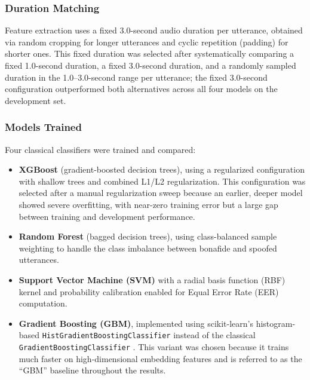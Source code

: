 \subsubsection{Duration Matching}

Feature extraction uses a fixed 3.0-second audio duration per utterance, obtained via random cropping for longer utterances and cyclic repetition (padding) for shorter ones. This fixed duration was selected after systematically comparing a fixed 1.0-second duration, a fixed 3.0-second duration, and a randomly sampled duration in the 1.0--3.0-second range per utterance; the fixed 3.0-second configuration outperformed both alternatives across all four models on the development set.

\subsubsection{Models Trained}

Four classical classifiers were trained and compared:
\begin{itemize}
    \item \textbf{XGBoost} \cite{Chen2016_xgboost} (gradient-boosted decision trees), using a regularized configuration with shallow trees and combined L1/L2 regularization. This configuration was selected after a manual regularization sweep because an earlier, deeper model showed severe overfitting, with near-zero training error but a large gap between training and development performance.
    
    \item \textbf{Random Forest} \cite{Breiman2001_rf} (bagged decision trees), using class-balanced sample weighting to handle the class imbalance between bonafide and spoofed utterances.
    
    \item \textbf{Support Vector Machine (SVM)} \cite{Cortes1995_svm} with a radial basis function (RBF) kernel and probability calibration enabled for Equal Error Rate (EER) computation.
    
    \item \textbf{Gradient Boosting (GBM)}, implemented using scikit-learn's histogram-based \texttt{HistGradientBoostingClassifier} \cite{Pedregosa2011_sklearn, Ke2017_lightgbm} instead of the classical \texttt{GradientBoostingClassifier} \cite{Friedman2001_gb}. This variant was chosen because it trains much faster on high-dimensional embedding features and is referred to as the ``GBM'' baseline throughout the results.
\end{itemize}

